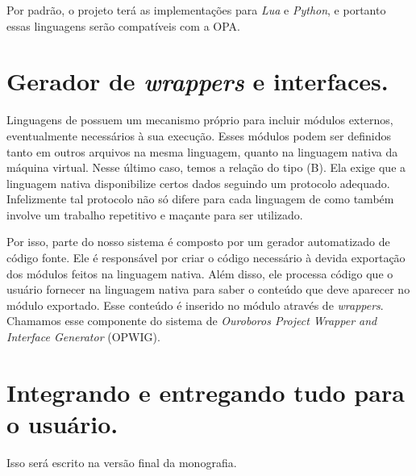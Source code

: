     
    Por padrão, o projeto terá as implementações para \textit{Lua} e
    \textit{Python}, e portanto essas linguagens serão compatíveis com a OPA.
    
  
  
  \section{Gerador de \emph{wrappers} e interfaces.}
  \label{sec:estrutura:opwig}


    Linguagens de \script{} possuem um mecanismo próprio para incluir módulos
    externos, eventualmente necessários à sua execução. Esses módulos podem ser
    definidos tanto em outros arquivos na mesma linguagem, quanto na linguagem
    nativa da máquina virtual. Nesse último caso, temos a relação do tipo (B). Ela
    exige que a linguagem nativa disponibilize certos dados seguindo um protocolo
    adequado. Infelizmente tal protocolo não só difere para cada linguagem de
    \script{} como também involve um trabalho repetitivo e maçante para ser utilizado. 

    
    Por isso, parte do nosso sistema é composto por um gerador automatizado de código fonte.
    Ele é responsável por criar o código necessário à devida exportação dos módulos 
    feitos na linguagem nativa. Além disso, ele processa código que o usuário fornecer na
    linguagem nativa para saber o conteúdo que deve aparecer no módulo exportado.
    Esse conteúdo é inserido no módulo através de \emph{wrappers}. Chamamos esse componente
    do sistema de \emph{Ouroboros Project Wrapper and Interface Generator} (OPWIG).
  
  
  \section{Integrando e entregando tudo para o usuário.}
  \label{sec:estrutura:integration}

    Isso será escrito na versão final da monografia.
